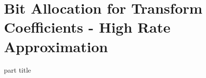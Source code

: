 \section{Bit Allocation for Transform Coefficients - High Rate Approximation}
\begin{frame}
 \vspace{12.0ex}
\begin{center}
\begin{beamercolorbox}[sep=12pt,center]{part title}
\insertsection\par
\end{beamercolorbox}
\end{center}
\end{frame}






